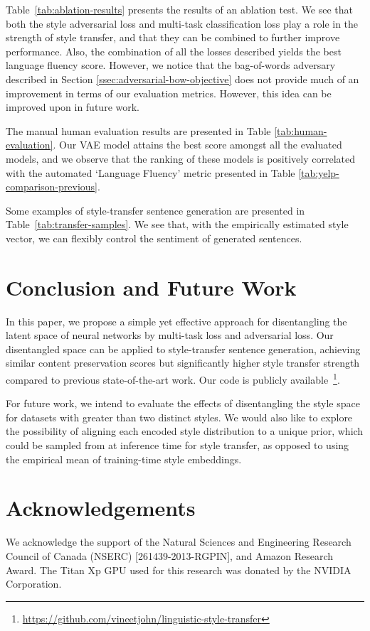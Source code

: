 \documentclass[11pt,a4paper]{article}
\begin{document}
Table~\ref{tab:ablation-results} presents the results of an ablation test. We see that both the style adversarial loss and multi-task classification loss play a role in the strength of style transfer, and that they can be combined to further improve performance. Also, the combination of all the losses described yields the best language fluency score. However, we notice that the bag-of-words adversary described in Section \ref{ssec:adversarial-bow-objective} does not provide much of an improvement in terms of our evaluation metrics. However, this idea can be improved upon in future work.

The manual human evaluation results are presented in Table \ref{tab:human-evaluation}. Our VAE model attains the best score amongst all the evaluated models, and we observe that the ranking of these models is positively correlated with the automated `Language Fluency' metric presented in Table \ref{tab:yelp-comparison-previous}.

Some examples of style-transfer sentence generation are presented in Table~\ref{tab:transfer-samples}. We see that, with the empirically estimated style vector, we can flexibly control the sentiment of generated sentences.


\section{Conclusion and Future Work}
In this paper, we propose a simple yet effective approach for disentangling the latent space of neural networks by multi-task loss and adversarial loss. Our disentangled space can be applied to style-transfer sentence generation, achieving similar content preservation scores but significantly higher style transfer strength compared to previous state-of-the-art work. Our code is publicly available~\footnote{\url{https://github.com/vineetjohn/linguistic-style-transfer}}.

For future work, we intend to evaluate the effects of disentangling the style space for datasets with greater than two distinct styles. We would also like to explore the possibility of aligning each encoded style distribution to a unique prior, which could be sampled from at inference time for style transfer, as opposed to using the empirical mean of training-time style embeddings.

\section{Acknowledgements}
We acknowledge the support of the Natural Sciences and Engineering Research Council of Canada (NSERC) [261439-2013-RGPIN], and Amazon Research Award. The Titan Xp GPU used for this research was donated by the NVIDIA Corporation.




\end{document}
